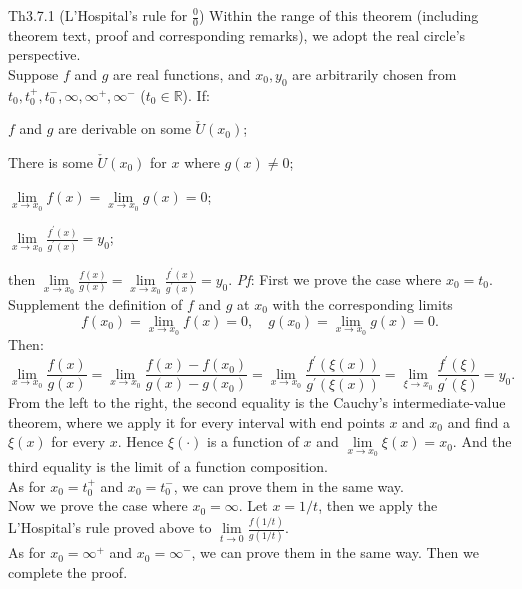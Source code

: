 \documentclass{article}
\begin{document}
\begin{Th}{Th3.7.1 (L'Hospital's rule for $\frac{0}{0}$)}
    Within the range of this theorem (including theorem text, proof and corresponding remarks), we adopt the real circle's perspective.\\
    Suppose $f$ and $g$ are real functions, and $x_0, y_0$ are arbitrarily chosen from $t_0, t_0^+, t_0^-, \infty, \infty^+, \infty^-$ ($t_0\in\mathbb{R}$). If:
    \begin{compactenum}
        \item $f$ and $g$ are derivable on some $\check{U}(x_0)$;
        \item There is some $\check{U}(x_0)$ for $x$ where $g(x)\neq 0$;
        \item $\lim\limits_{x\to x_0} f(x) = \lim\limits_{x\to x_0} g(x) = 0$;
        \item $\lim\limits_{x\to x_0} \frac{f^\prime(x)}{g^\prime(x)} = y_0$;
    \end{compactenum}
    then $\lim\limits_{x\to x_0} \frac{f(x)}{g(x)} = \lim\limits_{x\to x_0} \frac{f^\prime(x)}{g^\prime(x)} = y_0$.
    \tcblower
    \textit{Pf}: First we prove the case where $x_0 = t_0$. Supplement the definition of $f$ and $g$ at $x_0$ with the corresponding limits
    $$ f(x_0) = \lim\limits_{x\to x_0} f(x) = 0, \quad g(x_0) = \lim\limits_{x\to x_0} g(x) = 0. $$
    Then:
    $$ \lim\limits_{x\to x_0} \frac{f(x)}{g(x)} = \lim\limits_{x\to x_0} \frac{f(x)-f(x_0)}{g(x)-g(x_0)} = \lim\limits_{x\to x_0} \frac{f^\prime(\xi(x))}{g^\prime(\xi(x))} = \lim\limits_{\xi\to x_0} \frac{f^\prime(\xi)}{g^\prime(\xi)} = y_0. $$
    From the left to the right, the second equality is the Cauchy's intermediate-value theorem, where we apply it for every interval with end points $x$ and $x_0$ and find a $\xi(x)$ for every $x$. Hence $\xi(\cdot)$ is a function of $x$ and $\lim\limits_{x\to x_0} \xi(x) = x_0$. And the third equality is the limit of a function composition. \\
    As for $x_0=t_0^+$ and $x_0=t_0^-$, we can prove them in the same way.\\
    Now we prove the case where $x_0 = \infty$. Let $x = 1/t$, then we apply the L'Hospital's rule proved above to $\lim\limits_{t\to 0} \frac{f(1/t)}{g(1/t)}$.\\
    As for $x_0 = \infty^+$ and $x_0 = \infty^-$, we can prove them in the same way. Then we complete the proof.
\end{Th}
\end{document}

